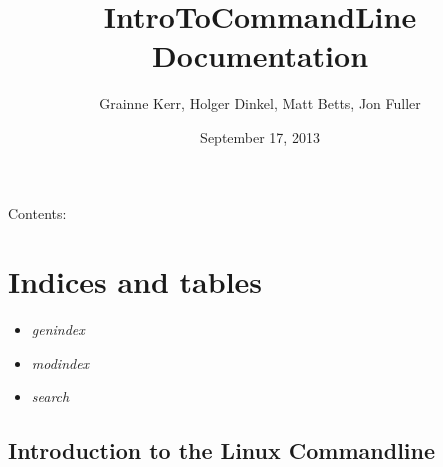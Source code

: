 \documentclass[letterpaper,10pt,english]{sphinxmanual}
\title{IntroToCommandLine Documentation}
\date{September 17, 2013}
\author{Grainne Kerr, Holger Dinkel, Matt Betts, Jon Fuller}
\begin{document}
\maketitle
\tableofcontents
{}\label{IntroToCommandLine::doc}


Contents:


\chapter{Indices and tables}
\label{IntroToCommandLine:indices-and-tables}\label{IntroToCommandLine:welcome-to-introtocommandline-s-documentation}\begin{itemize}
\item {} 
\emph{genindex}

\item {} 
\emph{modindex}

\item {} 
\emph{search}

\end{itemize}


\section{Introduction to the Linux Commandline}
\label{IntroToCommandLine:introduction-to-the-linux-commandline}
\end{document}
